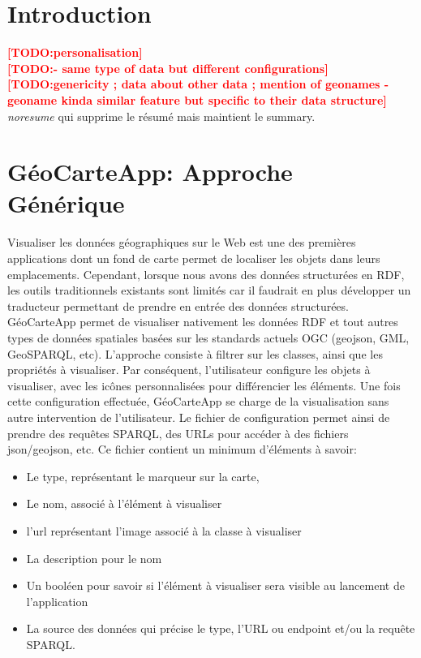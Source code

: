\documentclass[a4paper,pagenum,french,showlayout]{rnti}
\affiliation{
    \affil{1}Univ Lyon, MINES Saint-\'Etienne, CNRS, Laboratoire Hubert Curien UMR 5516, \\F-42023 Saint-\'Etienne, France\\
          \{prenom.nom\}@emse.fr\\
    \affil{2}Mondeca, \\ 35 boulevard Strasbourg, Paris, France\\
          ghislain.atemezing@mondeca.com\\
 }
\newcommand{\TODO}[1]{\textcolor{red}{\textbf{[TODO:#1]}}}
\begin{document}
%
\section{Introduction}

\TODO{personalisation} \\
\TODO{- same type of data but different configurations}\\

\TODO{genericity ; data about other data ; mention of geonames
    - geoname kinda similar feature but specific to their data structure}\\
    
\textit{noresume} qui supprime le résumé mais maintient le summary.

\section{GéoCarteApp: Approche Générique}
Visualiser les données géographiques sur le Web est une des premières applications dont un fond de carte permet de localiser les objets dans leurs emplacements. Cependant, lorsque nous avons des données structurées en RDF, les outils traditionnels existants sont limités car il faudrait en plus développer un traducteur permettant de prendre en entrée des données structurées. GéoCarteApp permet de visualiser nativement les données RDF et tout autres types de données spatiales basées sur les standards actuels OGC (geojson, GML, GeoSPARQL, etc). L’approche consiste à filtrer sur les classes, ainsi que les propriétés à visualiser. Par conséquent, l’utilisateur configure les objets à visualiser, avec les icônes personnalisées pour différencier les éléments. Une fois cette configuration effectuée, GéoCarteApp se charge de la visualisation sans autre intervention de l'utilisateur.
	Le fichier de configuration permet ainsi de prendre des requêtes SPARQL, des URLs pour accéder à des fichiers json/geojson, etc. Ce fichier contient un minimum d’éléments à savoir:
	\begin{itemize}
	\item Le type, représentant le marqueur sur la carte,
	\item Le nom, associé à l’élément à visualiser
	\item l’url représentant l’image associé à la classe à visualiser
	\item La description pour le nom
	\item Un booléen pour savoir si l’élément à visualiser sera visible au lancement de l’application
	\item La source des données qui précise le type, l’URL ou endpoint et/ou la requête SPARQL.
	\end{itemize}
\end{document}
